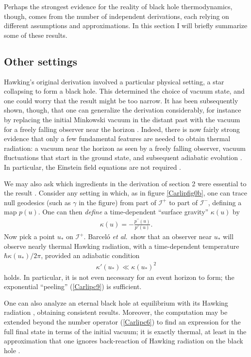 \documentclass[11pt]{article}
\begin{document}
Perhaps the strongest evidence for the reality of black hole thermodynamics,
though, comes from the number of independent derivations, each relying on
different assumptions and approximations.  In this section I will briefly 
summarize some of these results.

\subsection{Other settings \label{othera}}

Hawking's original derivation involved a particular physical setting, a star
collapsing to form a black hole.  This determined the choice of 
vacuum state, and one could worry that the result might be too narrow.  
It has been subsequently shown, though, that one can generalize the
derivation considerably, for instance by replacing the initial Minkowski 
vacuum in the distant past with the vacuum for a freely falling observer 
near the horizon \cite{Unruhc}.  Indeed, there is now fairly strong evidence 
that only a few fundamental features are needed to obtain thermal 
radiation: a vacuum near the horizon as seen by a freely falling observer, 
vacuum fluctuations that start in the ground state, and subsequent 
adiabatic evolution \cite{Schutzhold,Visser}.  In particular, the Einstein
field equations are not required \cite{Visser_essential}.

We may also ask which ingredients in the derivation of section 
2 were essential to the result \cite{BLSV}.  Consider any
setting in which, as in figure \ref{Carlipfig0b}, one can trace null
geodesics (such as $\gamma$ in the figure) from part of $\mathcal{I}^+$
to part of $\mathcal{I}^-$, defining a map $p(u)$.  One can then 
\emph{define} a time-dependent ``surface gravity'' $\kappa(u)$ by
\begin{align}
\kappa(u) = -\frac{p^{\prime\prime}(u)}{p'(u)}  .
\label{Carlipe0}
\end{align}
Now pick a point $u_*$ on $\mathcal{I}^+$.  Barcel{\'o} {\it et al.}\
show \cite{BLSV} that an observer near $u_*$ will observe
nearly thermal Hawking radiation, with a time-dependent temperature
$\hbar\kappa(u_*)/2\pi$, provided an adiabatic condition
\begin{align} 
\kappa'(u_*)\ll \kappa(u_*)^2
\label{Carlipe0a}
\end{align}
holds.  In particular, it is not even necessary for an event horizon to
form; the exponential ``peeling'' (\ref{Carlipc9}) is sufficient.

One can also analyze an eternal black 
hole at equilibrium with its Hawking radiation \cite{HartleHawking},
obtaining consistent results.  Moreover, the computation may
be extended beyond the number operator (\ref{Carlipc6}) to find an 
expression for the full final state in terms of the initial vacuum; 
it is exactly thermal, at least in the approximation that one ignores 
back-reaction of Hawking radiation on the black hole \cite{Wald,Parkerb}.
\end{document}
